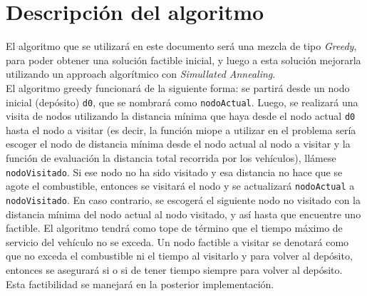 \documentclass[letter, 10pt]{article}
\begin{document}
\newpage

\section{Descripción del algoritmo}

El algoritmo que se utilizará en este documento será una mezcla de tipo \emph{Greedy}, para poder obtener una solución factible inicial, y luego a esta solución mejorarla utilizando un approach algorítmico con \emph{Simullated Annealing}.\\

El algoritmo greedy funcionará de la siguiente forma: se partirá desde un nodo inicial (depósito) \texttt{d0}, que se nombrará como \texttt{nodoActual}. Luego, se realizará una visita de nodos utilizando la distancia mínima que haya desde el nodo actual \texttt{d0} hasta el nodo a visitar (es decir, la función  miope a utilizar en el problema sería escoger el nodo de distancia mínima desde el nodo actual al nodo a visitar y la función de evaluación la distancia total recorrida por los vehículos), llámese \texttt{nodoVisitado}. Si ese nodo no ha sido visitado y esa distancia no hace que se agote el combustible, entonces se visitará el nodo y se actualizará \texttt{nodoActual} a \texttt{nodoVisitado}. En caso contrario, se escogerá el siguiente nodo no visitado con la distancia mínima del nodo actual al nodo visitado, y así hasta que encuentre uno factible. El algoritmo tendrá como tope de término que el tiempo máximo de servicio del vehículo no se exceda. Un nodo factible a visitar se denotará como que no exceda el combustible ni el tiempo al visitarlo y para volver al depósito, entonces se asegurará si o si de tener tiempo siempre para volver al depósito. Esta factibilidad se manejará en la posterior implementación.
\end{document}
